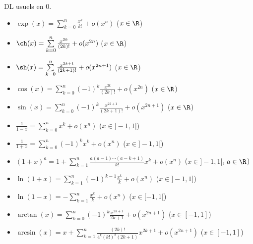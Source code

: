 \documentclass[11pt]{article}
\begin{document}
\begin{ex}{}{}
    DL usuels en 0.
    \tcblower
    \begin{itemize}
        \item $\exp(x) = \sum\limits_{k=0}^n \frac{x^k}{k!} + o(x^n)$ \quad ($x \in \R$)
        
        \item $\ch(x) = \sum\limits_{k=0}^n \frac{x^{2k}}{(2k)!} + o(x^{2n})$ \quad ($x \in \R$)
        
        \item $\sh(x) = \sum\limits_{k=0}^n \frac{x^{2k+1}}{(2k+1)!} + o(x^{2n+1})$ \quad ($x \in \R$)
        
        \item $\cos(x) = \sum\limits_{k=0}^n (-1)^k \frac{x^{2k}}{(2k)!} + o(x^{2n})$ \quad ($x \in \R$)
        
        \item $\sin(x) = \sum\limits_{k=0}^n (-1)^k \frac{x^{2k+1}}{(2k+1)!} + o(x^{2n+1})$ \quad ($x \in \R$)
        
        \item $\frac{1}{1-x} = \sum\limits_{k=0}^n x^k + o(x^n)$ \quad ($x \in ]-1,1[$)
        
        \item $\frac{1}{1+x} = \sum\limits_{k=0}^n (-1)^k x^k + o(x^n)$ \quad ($x \in ]-1,1[$)
        
        \item $(1+x)^a = 1 + \sum\limits_{k=1}^n \frac{a(a-1)\cdots(a-k+1)}{k!} x^k + o(x^n)$ \quad ($x \in ]-1,1[$, $a \in \R$)
        
        \item $\ln(1+x) = \sum\limits_{k=1}^n (-1)^{k-1} \frac{x^k}{k} + o(x^n)$ \quad ($x \in ]-1,1]$)
        
        \item $\ln(1-x) = -\sum\limits_{k=1}^n \frac{x^k}{k} + o(x^n)$ \quad ($x \in [-1,1[$)
        
        \item $\arctan(x) = \sum\limits_{k=0}^n (-1)^k \frac{x^{2k+1}}{2k+1} + o(x^{2n+1})$ \quad ($x \in [-1,1]$)
        
        \item $\arcsin(x) = x + \sum\limits_{k=1}^n \frac{(2k)!}{4^k (k!)^2 (2k+1)} x^{2k+1} + o(x^{2n+1})$ \quad ($x \in [-1,1]$)
    \end{itemize}
\end{ex}

\pagebreak
\end{document}
